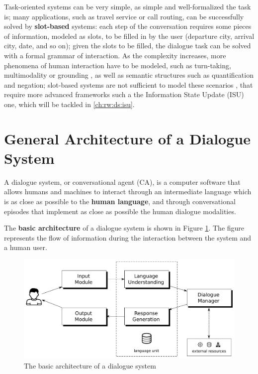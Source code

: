 Task-oriented systems can be very simple, as simple and well-formalized the task is;  many applications, such as travel service or call routing, can be successfully solved by \textbf{slot-based} systems: each step of the conversation requires some pieces of information, modeled as slots, to be filled in by the user (departure city, arrival city, date, and so on); given the slots to be filled, the dialogue task can be solved with a formal grammar of interaction. As the complexity increases, more phenomena of human interaction have to be modeled, such as turn-taking, multimodality or grounding
, as well as semantic structures such as quantification and negation; slot-based systems are not sufficient to model these scenarios \citep{Gabsdil03clarificationin}, that require more advanced frameworks such a the Information State Update (ISU) one, which will be tackled in \ref{ch:rw:ds:isu}.



\section{General Architecture of a Dialogue System} \label{ch:introduction:arch}
A dialogue system, or conversational agent (CA), is a computer software that allows humans and machines to interact through an intermediate language which is as close as possible to the \textbf{human language}, and through conversational episodes that implement as close as possible the human dialogue modalities.

The \textbf{basic architecture} of a dialogue system is shown in Figure \ref{ds_arch}. The figure represents the flow of information during the interaction between the system and a human user.

\begin{figure}
	\centering
	\includegraphics[width=15cm]{Pictures/ds_arch.pdf}
	\caption{The basic architecture of a dialogue system}
	\label{ds_arch}
\end{figure}
 
